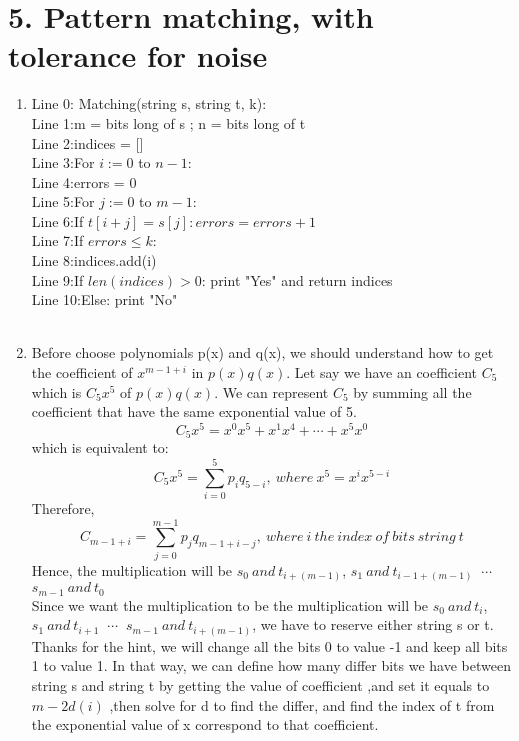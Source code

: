 \documentclass[11pt]{article}
\newenvironment{qparts}{\begin{enumerate}[{(}a{)}]}{\end{enumerate}}
\newcommand{\tab}{\hspace*{2em}}
\begin{document}
\newpage
\section*{5. Pattern matching, with tolerance for noise}
\begin{qparts}
\item
Line 0: Matching(string s, string t, k):\\
Line 1:\tab m = bits long of s ; n = bits long of t\\
Line 2:\tab indices = []\\
Line 3:\tab For $i:= 0 $ to $n - 1$:\\
Line 4:\tab\tab errors = 0\\
Line 5:\tab\tab For $j:= 0$ to $m - 1$:\\
Line 6:\tab\tab\tab If $t[i+j] = s[j]: errors = errors + 1 $\\
Line 7:\tab\tab If $errors \leqslant k:$\\
Line 8:\tab\tab\tab indices.add(i)\\
Line 9:\tab If $len(indices) > 0$: print "Yes" and return indices\\
Line 10:\tab Else: print "No"\\
\\
\item
Before choose polynomials p(x) and q(x), we should understand how to get the coefficient of $x^{m-1 + i}$ in $p(x)q(x)$.
Let say we have an coefficient $C_5$ which is $C_5 x^{5}$ of $p(x)q(x)$. We can represent $C_5$ by summing all the coefficient that have the same exponential value of 5. 
$$C_5 x^5 = x^0 x^5 + x^1 x^4 + \cdots + x^5 x^0$$
which is equivalent to:
$$C_5 x^5 = \sum\limits_{i=0}^5 p_i q_{5-i},\ where\ x^5 = x^i x^{5-i}$$
Therefore, $$C_{m-1 + i} = \sum\limits_{j=0}^{m-1} p_j q_{m-1+i - j},\ where\ i\ the\ index\ of\ bits\ string\ t$$
Hence, the multiplication will be $s_0\ and\ t_{i+ (m-1)}$, $s_1\ and\ t_{i-1+ (m-1)}\ $ $\cdots\ $ $s_{m-1}\ and\ t_0$\\
Since we want the multiplication to be the multiplication will be $s_0\ and\ t_i$, $s_1\ and\ t_{i+1}\ $ $\cdots\ $ $s_{m-1}\ and\ t_{i+ (m-1)}$, we have to reserve either string s or t.\\
Thanks for the hint, we will change all the bits 0 to value -1 and keep all bits 1 to value 1. In that way, we can define how many differ bits we have between string s and string t by getting the value of coefficient ,and set it equals to $m - 2d(i)$ ,then solve for d to find the differ, and find the index of t from the exponential value of x correspond to that coefficient.\\

\end{qparts}
\end{document}
